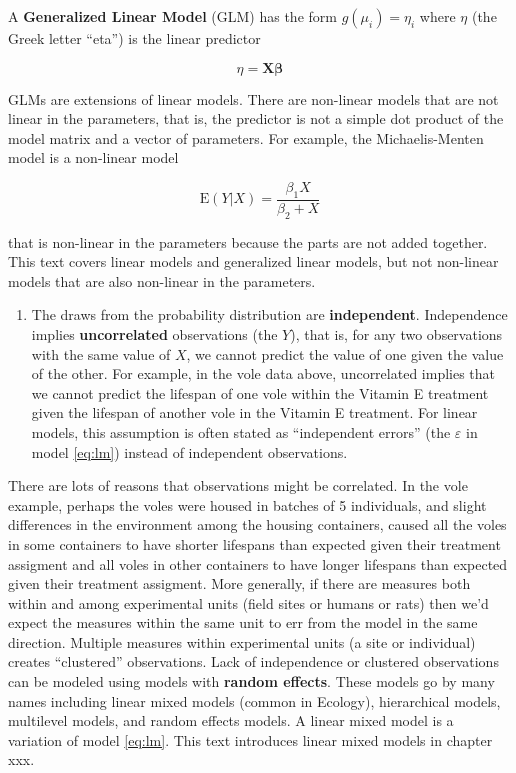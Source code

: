 \documentclass[]{book}
\providecommand{\tightlist}{%
  \setlength{\itemsep}{0pt}\setlength{\parskip}{0pt}}
\begin{document}
A \textbf{Generalized Linear Model} (GLM) has the form
\(g(\mu_i) = \eta_i\) where \(\eta\) (the Greek letter ``eta'') is the
linear predictor

\begin{equation}
\eta = \mathbf{X}\boldsymbol{\beta} 
\end{equation}

GLMs are extensions of linear models. There are non-linear models that
are not linear in the parameters, that is, the predictor is not a simple
dot product of the model matrix and a vector of parameters. For example,
the Michaelis-Menten model is a non-linear model

\begin{equation}
\mathrm{E}(Y|X)  = \frac{\beta_1 X}{\beta_2 + X}
\end{equation}

that is non-linear in the parameters because the parts are not added
together. This text covers linear models and generalized linear models,
but not non-linear models that are also non-linear in the parameters.

\begin{enumerate}
\def\labelenumi{\arabic{enumi}.}
\setcounter{enumi}{1}
\tightlist
\item
  The draws from the probability distribution are \textbf{independent}.
  Independence implies \textbf{uncorrelated} observations (the \(Y\)),
  that is, for any two observations with the same value of \(X\), we
  cannot predict the value of one given the value of the other. For
  example, in the vole data above, uncorrelated implies that we cannot
  predict the lifespan of one vole within the Vitamin E treatment given
  the lifespan of another vole in the Vitamin E treatment. For linear
  models, this assumption is often stated as ``independent errors'' (the
  \(\varepsilon\) in model \eqref{eq:lm}) instead of independent
  observations.
\end{enumerate}

There are lots of reasons that observations might be correlated. In the
vole example, perhaps the voles were housed in batches of 5 individuals,
and slight differences in the environment among the housing containers,
caused all the voles in some containers to have shorter lifespans than
expected given their treatment assigment and all voles in other
containers to have longer lifespans than expected given their treatment
assigment. More generally, if there are measures both within and among
experimental units (field sites or humans or rats) then we'd expect the
measures within the same unit to err from the model in the same
direction. Multiple measures within experimental units (a site or
individual) creates ``clustered'' observations. Lack of independence or
clustered observations can be modeled using models with \textbf{random
effects}. These models go by many names including linear mixed models
(common in Ecology), hierarchical models, multilevel models, and random
effects models. A linear mixed model is a variation of model
\eqref{eq:lm}. This text introduces linear mixed models in chapter xxx.
\end{document}
